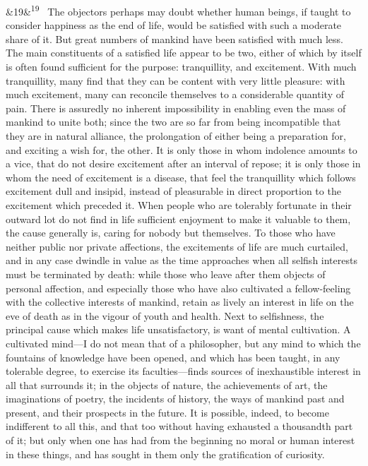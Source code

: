 \documentclass[12pt]{article}
\newcommand{\para}[1][]{\par\noindent\ifx&#1&\else\textsuperscript{\footnotesize #1}~\fi}
\begin{document}
\para[19] The objectors perhaps may doubt whether human beings, if taught to consider happiness as the end of life, would be satisfied with such a moderate share of it. But great numbers of mankind have been satisfied with much less. The main constituents of a satisfied life appear to be two, either of which by itself is often found sufficient for the purpose: tranquillity, and excitement. With much tranquillity, many find that they can be content with very little pleasure: with much excitement, many can reconcile themselves to a considerable quantity of pain. There is assuredly no inherent impossibility in enabling even the mass of mankind to unite both; since the two are so far from being incompatible that they are in natural alliance, the prolongation of either being a preparation for, and exciting a wish for, the other. It is only those in whom indolence amounts to a vice, that do not desire excitement after an interval of repose; it is only those in whom the need of excitement is a disease, that feel the tranquillity which follows excitement dull and insipid, instead of pleasurable in direct proportion to the excitement which preceded it. When people who are tolerably fortunate in their outward lot do not find in life sufficient enjoyment to make it valuable to them, the cause generally is, caring for nobody but themselves. To those who have neither public nor private affections, the excitements of life are much curtailed, and in any case dwindle in value as the time approaches when all selfish interests must be terminated by death: while those who leave after them objects of personal affection, and especially those who have also cultivated a fellow-feeling with the collective interests of mankind, retain as lively an interest in life on the eve of death as in the vigour of youth and health. Next to selfishness, the principal cause which makes life unsatisfactory, is want of mental cultivation. A cultivated mind---I do not mean that of a philosopher, but any mind to which the fountains of knowledge have been opened, and which has been taught, in any tolerable degree, to exercise its faculties---finds sources of inexhaustible interest in all that surrounds it; in the objects of nature, the achievements of art, the imaginations of poetry, the incidents of history, the ways of mankind past and present, and their prospects in the future. It is possible, indeed, to become indifferent to all this, and that too without having exhausted a thousandth part of it; but only when one has had from the beginning no moral or human interest in these things, and has sought in them only the gratification of curiosity.
\end{document}
